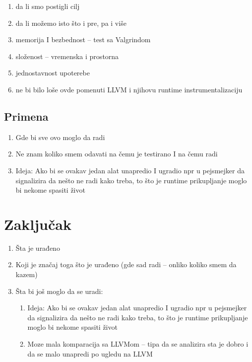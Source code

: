 \documentclass[12pt,oneside]{memoir}
\begin{document}
\begin{enumerate}
\item da li smo postigli cilj
\item da li možemo isto što i pre, pa i više
\item memorija I bezbednost – test sa Valgrindom
\item složenost – vremenska i prostorna
\item jednostavnost upoterebe
\item ne bi bilo loše ovde pomenuti LLVM i njihovu runtime instrumentalizaciju 
\end{enumerate}

\section{Primena}

\begin{enumerate}
\item Gde bi sve ovo moglo da radi
\item Ne znam koliko smem odavati na čemu je testirano I na čemu radi
\item Ideja: Ako bi se ovakav jedan alat unapredio I ugradio npr u pejsmejker da signalizira da nešto ne radi kako treba, to što je runtime prikupljanje moglo bi nekome spasiti život
\end{enumerate}


\chapter{Zaključak}


\begin{enumerate}
\item Šta je urađeno
\item Koji je značaj toga što je urađeno (gde sad radi – onliko koliko smem da kazem)
\item Šta bi još moglo da se uradi:
\begin{enumerate}
\item Ideja: Ako bi se ovakav jedan alat unapredio I ugradio npr u pejsmejker da signalizira da nešto ne radi kako treba, to što je runtime prikupljanje moglo bi nekome spasiti život
\item Moze mala komparacija sa LLVMom – tipa da se analizira sta je dobro i da se malo unapredi po ugledu na LLVM
\end{enumerate}
\end{enumerate}
\end{document}
